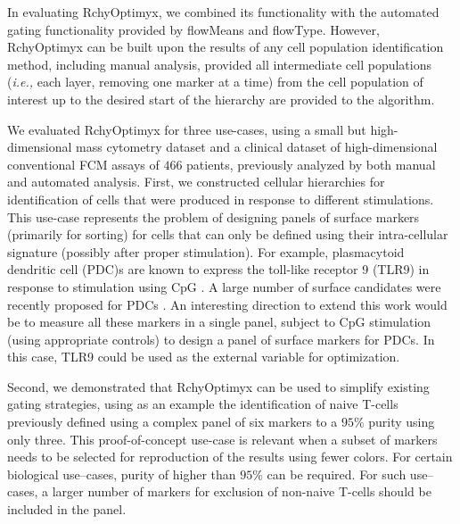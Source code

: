 
In evaluating  RchyOptimyx, we  combined its functionality with the
automated gating functionality provided by flowMeans and flowType. 
However,  RchyOptimyx can be built upon the results of any cell  %
population identification method, including manual analysis, provided
all intermediate cell populations (\emph{i.e.,} each layer, removing one marker at a time) from the cell population of interest  up to the desired start of the hierarchy are provided to the algorithm.

We evaluated RchyOptimyx for three use-cases, using a small but high-dimensional mass cytometry dataset and a clinical dataset of high-dimensional conventional FCM  assays of $466$ patients, previously analyzed by both manual and automated analysis.
First, we constructed cellular hierarchies for identification of cells that were produced in response to different stimulations.
This use-case represents the problem of designing panels of surface markers (primarily for sorting) for cells that can only be defined using their intra-cellular signature (possibly after proper stimulation). 
For example, plasmacytoid dendritic cell (PDC)s are known to express the toll-like receptor 9 (TLR9) in response to stimulation using CpG \cite{krug2001toll}. 
A large number of surface candidates were recently proposed for PDCs \cite{marafioti2008novel,swiecki2010unraveling,schuster2010co,cao2009molecular}.
An interesting direction to extend this work  would be to measure all these markers in a single panel, subject to CpG stimulation (using appropriate controls) to design a panel of surface markers for PDCs.
In this  case, TLR9 could be used as the external variable for optimization.

Second, we demonstrated that RchyOptimyx can be used to simplify existing gating strategies, using as an example the identification of naive T-cells previously defined using a complex panel of six markers to a $95\%$ purity using only three. 
This proof-of-concept use-case is relevant when a subset of markers needs to be selected for reproduction of the results using fewer colors.
For certain biological use--cases, purity of higher than $95\%$ can be required.
For such use--cases, a larger number of markers for exclusion of non-naive T-cells should be included in the panel.


